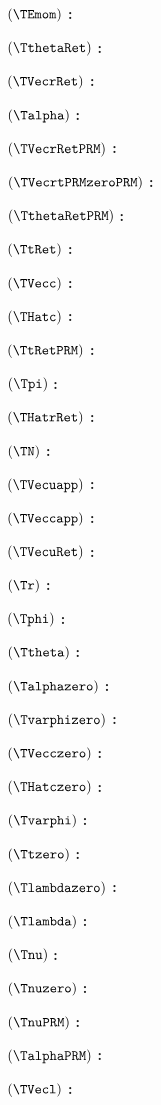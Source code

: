 $( \TEmom )$ \textbf{:} \TEmomdef

$( \TthetaRet )$ \textbf{:} \TthetaRetdef

$( \TVecrRet )$ \textbf{:} \TVecrRetdef

$( \Talpha )$ \textbf{:} \Talphadef

$( \TVecrRetPRM )$ \textbf{:} \TVecrRetPRMdef

$( \TVecrtPRMzeroPRM )$ \textbf{:} \TVecrtPRMzeroPRMdef

$( \TthetaRetPRM )$ \textbf{:} \TthetaRetPRMdef

$( \TtRet )$ \textbf{:} \TtRetdef

$( \TVecc )$ \textbf{:} \TVeccdef

$( \THatc )$ \textbf{:} \THatcdef

$( \TtRetPRM )$ \textbf{:} \TtRetPRMdef

$( \Tpi )$ \textbf{:} \Tpidef

$( \THatrRet )$ \textbf{:} \THatrRetdef

$( \TN )$ \textbf{:} \TNdef

$( \TVecuapp )$ \textbf{:} \TVecuappdef

$( \TVeccapp )$ \textbf{:} \TVeccappdef

$( \TVecuRet )$ \textbf{:} \TVecuRetdef

$( \Tr )$ \textbf{:} \Trdef

$( \Tphi )$ \textbf{:} \Tphidef

$( \Ttheta )$ \textbf{:} \Tthetadef

$( \Talphazero )$ \textbf{:} \Talphazerodef

$( \Tvarphizero )$ \textbf{:} \Tvarphizerodef

$( \TVecczero )$ \textbf{:} \TVecczerodef

$( \THatczero )$ \textbf{:} \THatczerodef

$( \Tvarphi )$ \textbf{:} \Tvarphidef

$( \Ttzero )$ \textbf{:} \Ttzerodef

$( \Tlambdazero )$ \textbf{:} \Tlambdazerodef

$( \Tlambda )$ \textbf{:} \Tlambdadef

$( \Tnu )$ \textbf{:} \Tnudef

$( \Tnuzero )$ \textbf{:} \Tnuzerodef

$( \TnuPRM )$ \textbf{:} \TnuPRMdef

$( \TalphaPRM )$ \textbf{:} \TalphaPRMdef

$( \TVecl )$ \textbf{:} \TVecldef


